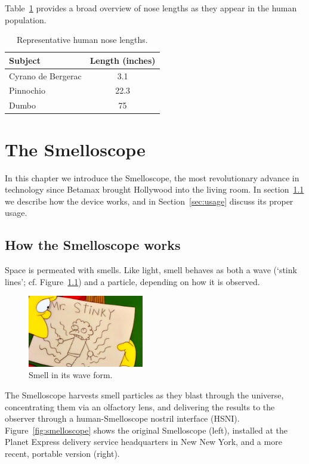 \documentclass[singlespace]{../unmthesis}
\begin{document}
Table~\ref{tab:lengths} provides a broad overview of nose lengths as they appear in the human population.

%
%
\begin{table}[ht]
    \centering
    \begin{tabular}{lc}
        \toprule
				Subject & Length (inches)\\
				\midrule
			  Cyrano de Bergerac & 3.1\\
        Pinnochio & 22.3 \\
        Dumbo & 75\\
        \bottomrule
    \end{tabular}
    \caption{Representative human nose lengths.}
    \label{tab:lengths}
\end{table}

\chapter{The Smelloscope}\label{chapter:02}

In this chapter we introduce the Smelloscope, the most revolutionary advance in technology since Betamax brought 
Hollywood into the living room. In section~\ref{sec:smelloscope} we describe how the device works, and in Section~\ref{sec:usage} discuss its proper usage. 

\section{How the Smelloscope works}\label{sec:smelloscope}

Space is permeated with smells. Like light, smell behaves as both a wave (`stink lines'; cf. 
Figure~\ref{fig:stink-lines}) and a particle, depending on how it is observed. 
\begin{figure}[h]
\centering
\includegraphics[width=0.45\textwidth]{./figures/stink-lines}
\caption{Smell in its wave form.}
\label{fig:stink-lines}
\end{figure}

The Smelloscope harvests smell particles as they blast through the universe, concentrating them via 
an olfactory lens, and delivering the results to the observer through a human-Smelloscope nostril 
interface (HSNI). Figure~\ref{fig:smelloscope} shows the original Smelloscope (left), installed at the 
Planet Express delivery service headquarters in New New York, and a more recent, portable version (right).
\end{document}
